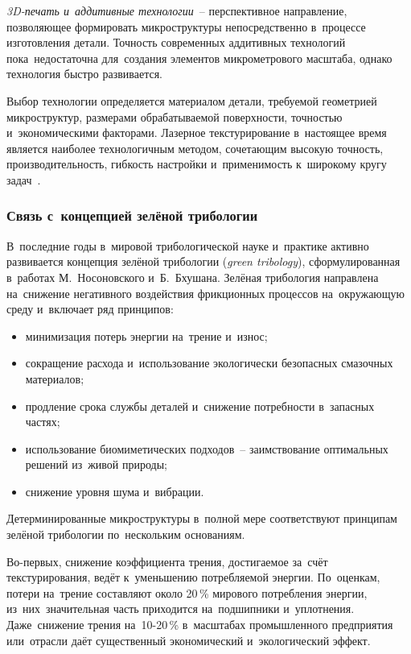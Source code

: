\textit{3D-печать и~аддитивные технологии}~-- перспективное направление, позволяющее формировать микроструктуры непосредственно в~процессе изготовления детали. Точность современных аддитивных технологий пока~недостаточна для~создания элементов микрометрового масштаба, однако технология быстро развивается.

Выбор технологии определяется материалом детали, требуемой геометрией микроструктур, размерами обрабатываемой поверхности, точностью и~экономическими факторами. Лазерное текстурирование в~настоящее время является наиболее технологичным методом, сочетающим высокую точность, производительность, гибкость настройки и~применимость к~широкому кругу задач~\cite{vladescu2019,petrovsky2020,bashmur2023a}.

\subsubsection{Связь с~концепцией зелёной трибологии}

В~последние годы в~мировой трибологической науке и~практике активно развивается концепция зелёной трибологии (\textit{green tribology}), сформулированная в~работах М.~Носоновского и~Б.~Бхушана. Зелёная трибология направлена на~снижение негативного воздействия фрикционных процессов на~окружающую среду и~включает ряд принципов:
\begin{itemize}
\item минимизация потерь энергии на~трение и~износ;
\item сокращение расхода и~использование экологически безопасных смазочных материалов;
\item продление срока службы деталей и~снижение потребности в~запасных частях;
\item использование биомиметических подходов~-- заимствование оптимальных решений из~живой природы;
\item снижение уровня шума и~вибрации.
\end{itemize}

Детерминированные микроструктуры в~полной мере соответствуют принципам зелёной трибологии по~нескольким основаниям.

Во-первых, снижение коэффициента трения, достигаемое за~счёт текстурирования, ведёт к~уменьшению потребляемой энергии. По~оценкам, потери на~трение составляют около 20\,\% мирового потребления энергии, из~них~значительная часть приходится на~подшипники и~уплотнения. Даже~снижение трения на~10-20\,\% в~масштабах промышленного предприятия или~отрасли даёт существенный экономический и~экологический эффект.

